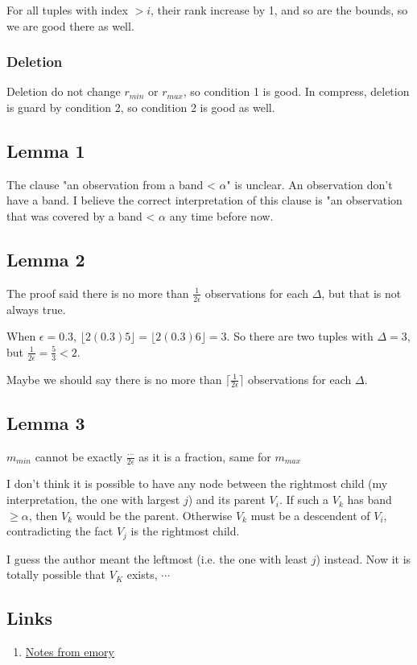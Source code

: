 \documentclass{article}
\begin{document}
For all tuples with index $ > i$, their rank increase by 1, and so are the bounds, so we are good there as well.

\subsubsection*{Deletion}
Deletion do not change $ r_{min} $ or $ r_{max} $, so condition 1 is good. In compress, deletion is guard by condition 2, so condition 2 is good as well.

\subsection*{Lemma 1}
The clause "an observation from a band < $\alpha$" is unclear. An observation don't have a band. I believe the correct interpretation of this clause is "an observation that was covered by a band < $\alpha$ any time before now.

\subsection*{Lemma 2}
The proof said there is no more than $ \frac{1}{2\epsilon} $ observations for each $ \Delta $, but that is not always true.

When $ \epsilon = 0.3 $, $ \lfloor 2(0.3)5 \rfloor = \lfloor 2(0.3)6 \rfloor = 3 $. So there are two tuples with $ \Delta =  3 $, but $ \frac{1}{2\epsilon} = \frac{5}{3} < 2 $. 

Maybe we should say there is no more than $ \lceil \frac{1}{2\epsilon} \rceil $ observations for each $ \Delta $.

\subsection*{Lemma 3}
$ m_{min} $ cannot be exactly $ \frac{\cdots}{2\epsilon} $ as it is a fraction, same for $ m_{max} $

I don't think it is possible to have any node between the rightmost child (my interpretation, the one with largest $ j $) and its parent $ V_i $. If such a $ V_k $ has band $ \ge \alpha $, then $ V_k $ would be the parent. Otherwise $ V_k $ must be a descendent of $ V_i $, contradicting the fact $ V_j $ is the rightmost child.

I guess the author meant the leftmost (i.e. the one with least $ j $) instead. Now it is totally possible that $ V_K $ exists, $ \cdots $


\subsection*{Links}
\begin{enumerate}
    \item {\href{http://www.mathcs.emory.edu/~cheung/Courses/584/Syllabus/08-Quantile/Greenwald2.html}{Notes from emory}}
\end{enumerate}
\end{document}
